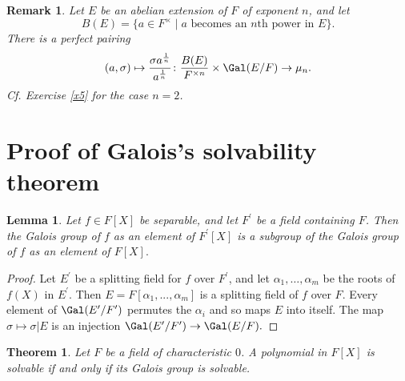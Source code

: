 \documentclass[a4paper,11pt,final,openany]{memoir}
\newtheorem{lemma}[X]{Lemma}
\newtheorem{theorem}[X]{Theorem}
\newtheorem{remark}[X]{Remark}
\theoremstyle{nonumberplain}
\newtheorem{proof}{Proof.}
\begin{document}
\begin{remark}
\label{ag22}Let $E$ be an abelian extension of $F$ of exponent $n$, and let
\[
B(E)=\{a\in F^{\times}\mid a\text{\ becomes an }n\text{th power in }E\}.
\]
There is a perfect pairing
\[
(a,\sigma)\mapsto\frac{\sigma a^{\frac{1}{n}}}{a^{\frac{1}{n}}}\colon
\frac{B(E)}{F^{\times n}}\times\Gal(E/F)\rightarrow\mu_{n}.
\]
Cf. Exercise \ref{x5} for the case $n=2$.
\end{remark}

\section{Proof of Galois's solvability theorem}

\begin{lemma}
\label{ag24}Let $f\in F[X]$ be separable, and let $F^{\prime}$ be a field
containing $F$. Then the Galois group of $f$ as an element of $F^{\prime}[X]$
is a subgroup of the Galois group of $f$ as an element of $F[X].$
\end{lemma}

\begin{proof}
Let $E^{\prime}$ be a splitting field for $f$ over $F^{\prime}$, and let
$\alpha_{1},\ldots,\alpha_{m}$ be the roots of $f(X)$ in $E^{\prime}$. Then
$E=F[\alpha_{1},...,\alpha_{m}]$ is a splitting field of $f$ over $F$. Every
element of $\Gal(E^{\prime}/F^{\prime})$ permutes the $\alpha_{i}$ and so maps
$E$ into itself. The map $\sigma\mapsto\sigma|E$ is an injection
$\Gal(E^{\prime}/F^{\prime})\rightarrow\Gal(E/F).$
\end{proof}

\begin{theorem}
\label{ag23} Let $F$ be a field of characteristic $0$. A polynomial in $F[X]$
is solvable if and only if its Galois group is solvable.
\end{theorem}
\end{document}
